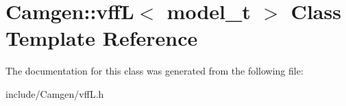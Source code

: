 \hypertarget{a00589}{}\section{Camgen\+:\+:vff\+L$<$ model\+\_\+t $>$ Class Template Reference}
\label{a00589}


The documentation for this class was generated from the following file\+:\begin{DoxyCompactItemize}
\item 
include/\+Camgen/vff\+L.\+h\end{DoxyCompactItemize}
